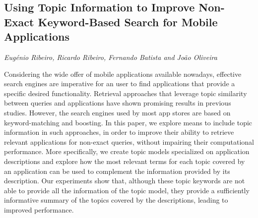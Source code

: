 \documentclass[../booklet.tex]{subfiles}
\begin{document}
\subsection[Using Topic Information to Improve Non-Exact Keyword-Based Search for Mobile Applications. {\it Eugénio Ribeiro, Ricardo Ribeiro, Fernando Batista and João Oliveira}]{Using Topic Information to Improve Non-Exact Keyword-Based Search for Mobile Applications}
   

\begin{center}
  {\it Eugénio Ribeiro, Ricardo Ribeiro, Fernando Batista and João Oliveira}
\end{center}

\vskip 0.8cm


Considering the wide offer of mobile applications available nowadays, effective search engines are imperative for an user to find applications that provide a specific desired functionality. Retrieval approaches that leverage topic similarity between queries and applications have shown promising results in previous studies. However, the search engines used by most app stores are based on keyword-matching and boosting. In this paper, we explore means to include topic information in such approaches, in order to improve their ability to retrieve relevant applications for non-exact queries, without impairing their computational performance. More specifically, we create topic models specialized on application descriptions and explore how the most relevant terms for each topic covered by an application can be used to complement the information provided by its description. Our experiments show that, although these topic keywords are not able to provide all the information of the topic model, they provide a sufficiently informative summary of the topics covered by the descriptions, leading to improved performance.

\end{document}
